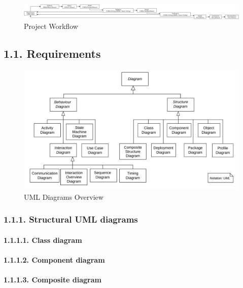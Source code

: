 \documentclass[
]{article}
\begin{document}
\begin{figure}
\centering
\includegraphics{../doc/project.svg}
\caption{Project Workflow}
\end{figure}

\hypertarget{requirements-1}{%
\subsection{1.1. Requirements}\label{requirements-1}}

\begin{figure}
\centering
\includegraphics{../requirements/uml_diagrams_overview.svg}
\caption{UML Diagrams Overview}
\end{figure}

\hypertarget{structural-uml-diagrams-1}{%
\subsubsection{1.1.1. Structural UML
diagrams}\label{structural-uml-diagrams-1}}

\hypertarget{class-diagram-1}{%
\paragraph{1.1.1.1. Class diagram}\label{class-diagram-1}}

\hypertarget{component-diagram-1}{%
\paragraph{1.1.1.2. Component diagram}\label{component-diagram-1}}

\hypertarget{composite-diagram-1}{%
\paragraph{1.1.1.3. Composite diagram}\label{composite-diagram-1}}
\end{document}
